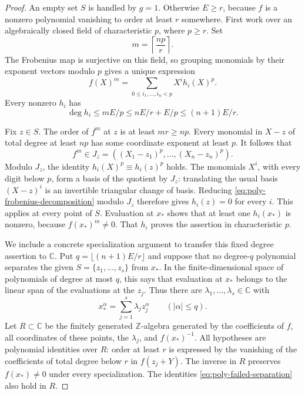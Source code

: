 \begin{proof}
An empty set $S$ is handled by $g=1$.  Otherwise $E\ge r$, because $f$ is a nonzero polynomial vanishing to order at least $r$ somewhere. First work over an algebraically closed field of characteristic $p$, where $p\ge r$.  Set
\[
 m=\left\lceil\frac{np}{r}\right\rceil.
\]
The Frobenius map is surjective on this field, so grouping monomials by their exponent vectors modulo $p$ gives a unique expression
\begin{equation}\label{eq:poly-frobenius-decomposition}
 f(X)^m=\sum_{0\le i_1,\ldots,i_n<p}X^i h_i(X)^p.
\end{equation}
Every nonzero $h_i$ has
\[
 \deg h_i\le mE/p\le nE/r+E/p\le(n+1)E/r.
\]

Fix $z\in S$.  The order of $f^m$ at $z$ is at least $mr\ge np$. Every monomial in $X-z$ of total degree at least $np$ has some coordinate exponent at least $p$.  It follows that
\[
 f^m\in J_z=((X_1-z_1)^p,\ldots,(X_n-z_n)^p).
\]
Modulo $J_z$, the identity $h_i(X)^p\equiv h_i(z)^p$ holds.  The monomials $X^i$, with every digit below $p$, form a basis of the quotient by $J_z$: translating the usual basis $(X-z)^i$ is an invertible triangular change of basis.  Reducing \eqref{eq:poly-frobenius-decomposition} modulo $J_z$ therefore gives $h_i(z)=0$ for every $i$.  This applies at every point of $S$. Evaluation at $x_*$ shows that at least one $h_i(x_*)$ is nonzero, because $f(x_*)^m\ne0$.  That $h_i$ proves the assertion in characteristic $p$.

We include a concrete specialization argument to transfer this fixed degree assertion to $\mathbb{C}$.  Put $q=\lfloor(n+1)E/r\rfloor$ and suppose that no degree-$q$ polynomial separates the given $S=\{z_1,\ldots,z_s\}$ from $x_*$.  In the finite-dimensional space of polynomials of degree at most $q$, this says that evaluation at $x_*$ belongs to the linear span of the evaluations at the $z_j$.  Thus there are $\lambda_1,\ldots,\lambda_s\in\mathbb{C}$ with
\begin{equation}\label{eq:poly-failed-separation}
 x_*^\alpha=\sum_{j=1}^s\lambda_j z_j^\alpha
            \qquad(|\alpha|\le q).
\end{equation}
Let $R\subset\mathbb{C}$ be the finitely generated $\mathbb{Z}$-algebra generated by the coefficients of $f$, all coordinates of these points, the $\lambda_j$, and $f(x_*)^{-1}$.  All hypotheses are polynomial identities over $R$: order at least $r$ is expressed by the vanishing of the coefficients of total degree below $r$ in $f(z_j+Y)$. The inverse in $R$ preserves $f(x_*)\ne0$ under every specialization. The identities \eqref{eq:poly-failed-separation} also hold in $R$.


\end{proof}
